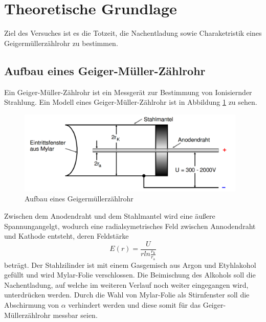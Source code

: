 \section{Theoretische Grundlage}
\label{sec:Theorie}
Ziel des Versuches ist es die Totzeit, die Nachentladung sowie Charaketristik eines Geigermüllerzählrohr zu bestimmen.


\subsection{Aufbau eines Geiger-Müller-Zählrohr}
Ein Geiger-Müller-Zählrohr ist ein Messgerät zur Bestimmung von Ionisiernder Strahlung. Ein Modell eines Geiger-Müller-Zählrohr ist in Abbildung \ref{fig:skizze} zu sehen.
\begin{figure}
  \centering
  \includegraphics[height=4cm]{picture/Skizze.pdf}
  \caption{Aufbau eines Geigermüllerzählrohr \cite{sample}}
  \label{fig:skizze}
\end{figure}
Zwischen dem Anodendraht und dem Stahlmantel wird eine äußere Spannungangelgt, wodurch eine radialsymetrisches Feld zwischen Annodendraht und Kathode entsteht, deren Feldstärke
\begin{equation}
  E(r) = \frac{U}{r ln \frac{r_\text{k}}{r_\text{a}}}
  \label{eqn:feld}
\end{equation}
beträgt. Der Stahlzilinder ist mit einem Gasgemisch aus Argon und Etyhlakohol gefüllt und wird Mylar-Folie verschlossen. Die Beimischung des Alkohols soll die Nachentladung, auf welche im weiteren Verlauf noch weiter eingegangen wird, unterdrücken werden. Durch die Wahl von Mylar-Folie als Stirnfenster soll die Abschirmung von $\alpha$ verhindert werden und diese somit für das Geiger-Müllerzählrohr messbar seien.



